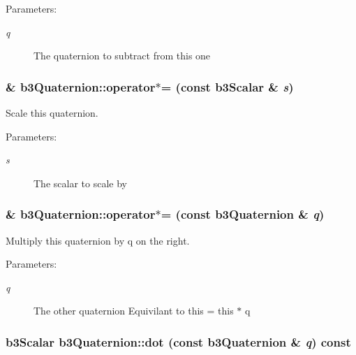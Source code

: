 \begin{Desc}
\item[Parameters:]
\begin{description}
\item[{\em q}]The quaternion to subtract from this one \end{description}
\end{Desc}
\hypertarget{classb3_quaternion_b21bc07cb139b5f1f604432666a28deb}{
\subsubsection[operator$\ast$=]{\& b3Quaternion::operator$\ast$= (const b3Scalar \& {\em s})}}
\label{classb3_quaternion_b21bc07cb139b5f1f604432666a28deb}


Scale this quaternion. 

\begin{Desc}
\item[Parameters:]
\begin{description}
\item[{\em s}]The scalar to scale by \end{description}
\end{Desc}
\hypertarget{classb3_quaternion_756f3ae0fbbdf018fb3d63b95f4ddcaa}{
\subsubsection[operator$\ast$=]{\& b3Quaternion::operator$\ast$= (const {\bf b3Quaternion} \& {\em q})}}
\label{classb3_quaternion_756f3ae0fbbdf018fb3d63b95f4ddcaa}


Multiply this quaternion by q on the right. 

\begin{Desc}
\item[Parameters:]
\begin{description}
\item[{\em q}]The other quaternion Equivilant to this = this $\ast$ q \end{description}
\end{Desc}
\hypertarget{classb3_quaternion_747537c86fc2d63a6fc43db811952634}{
\subsubsection[dot]{\setlength{\rightskip}{0pt plus 5cm}b3Scalar b3Quaternion::dot (const {\bf b3Quaternion} \& {\em q}) const}}
\label{classb3_quaternion_747537c86fc2d63a6fc43db811952634}


